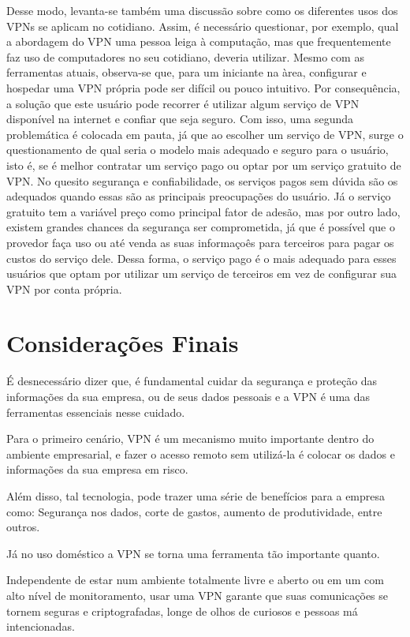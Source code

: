 \documentclass[12pt]{article}
\begin{document}
\begin{flushleft}
Desse modo, levanta-se também uma discussão sobre como os diferentes usos dos VPNs se aplicam no cotidiano.
Assim, é necessário questionar, por exemplo, qual a abordagem do VPN uma pessoa leiga à
computação, mas que frequentemente faz uso de computadores no seu cotidiano, deveria utilizar.
Mesmo com as ferramentas atuais, observa-se que, para um iniciante na àrea, configurar e hospedar
uma VPN própria pode ser difícil ou pouco intuitivo.
Por consequência, a solução que este usuário pode recorrer é utilizar algum serviço de VPN disponível
na internet e confiar que seja seguro. 
Com isso, uma segunda problemática é colocada em pauta, já que ao escolher um serviço de VPN, 
surge o questionamento de qual seria o modelo mais adequado e seguro para o usuário, isto é, se é melhor
contratar um serviço pago ou optar por um serviço gratuito de VPN.
No quesito segurança e confiabilidade, os serviços pagos sem dúvida são os adequados quando essas
são as principais preocupações do usuário.
Já o serviço gratuito tem a variável preço como principal fator de adesão, mas por outro lado, existem
grandes chances da segurança ser comprometida, já que é possível que o provedor faça uso ou até venda
as suas informaçoês para terceiros para pagar os custos do serviço dele.
Dessa forma, o serviço pago é o mais adequado para esses usuários que optam por utilizar um serviço de
terceiros em vez de configurar sua VPN por conta própria. 


\section{Considerações Finais}

É desnecessário dizer que, é fundamental cuidar da segurança e proteção das informações da sua empresa, ou de seus dados pessoais e a VPN é uma das ferramentas essenciais nesse cuidado.

Para o primeiro cenário, VPN é um mecanismo muito importante dentro do ambiente empresarial, e fazer o acesso remoto sem utilizá-la é colocar os dados e informações da sua empresa em risco.

Além disso, tal tecnologia, pode trazer uma série de benefícios para a empresa como: Segurança nos dados, corte de gastos, aumento de produtividade, entre outros.

Já no uso doméstico a VPN se torna uma ferramenta tão importante quanto. 

Independente de estar num ambiente totalmente livre e aberto ou em um com alto nível de monitoramento, usar uma VPN garante que suas comunicações se tornem seguras e criptografadas, longe de olhos de curiosos e pessoas má intencionadas.


\end{flushleft}
\end{document}
